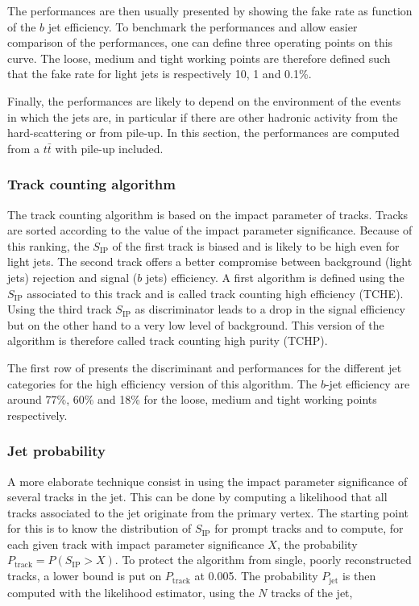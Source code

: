     The performances are then usually presented by showing the fake rate as function
    of the $b$ jet efficiency. To benchmark the performances and allow easier comparison
    of the performances, one can define three operating points on this curve. The
    loose, medium and tight working points are therefore defined such that the fake rate
    for light jets is respectively 10, 1 and 0.1\%.

    Finally, the performances are likely to depend on the environment of the events in which
    the jets are, in particular if there are other hadronic activity from the hard-scattering
    or from pile-up. In this section, the performances are computed from a $t\bar{t}$ with
    pile-up included.

        \subsubsection{Track counting algorithm}

    The track counting algorithm is based on the impact parameter of tracks. Tracks are
    sorted according to the value of the impact parameter significance. Because of this
    ranking, the $S_\text{IP}$ of the first track is biased and is likely to be high even
    for light jets. The second track offers a better compromise between background (light
    jets) rejection and signal ($b$ jets) efficiency. A first algorithm is defined using
    the $S_\text{IP}$ associated to this track and is called track counting high efficiency
    (TCHE). Using the third track $S_\text{IP}$ as discriminator leads to a drop in the
    signal efficiency but on the other hand to a very low level of background. This
    version of the algorithm is therefore called track counting high purity (TCHP).

    The first row of  presents the discriminant and
    performances for the different jet categories for the high efficiency version of this
    algorithm. The $b$-jet efficiency are around 77\%, 60\% and 18\% for the loose, medium
    and tight working points respectively.

        \subsubsection{Jet probability}

    A more elaborate technique consist in using the impact parameter significance of
    several tracks in the jet. This can be done by computing a likelihood that all tracks
    associated to the jet originate from the primary vertex. The starting point for this
    is to know the distribution of $S_\text{IP}$ for prompt tracks and to compute, for
    each given track with impact parameter significance $X$, the probability $P_\text{track} =
    P(S_\text{IP} > X)$. To protect the algorithm from single, poorly reconstructed tracks,
    a lower bound is put on $P_\text{track}$ at 0.005. The probability $P_\text{jet}$ is
    then computed with the likelihood estimator, using the $N$ tracks of the jet,

